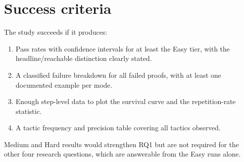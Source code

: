 \section{Success criteria}

The study succeeds if it produces:
\begin{enumerate}
  \item Pass rates with confidence intervals for at least the Easy tier,
        with the headline/reachable distinction clearly stated.
  \item A classified failure breakdown for all failed proofs,
        with at least one documented example per mode.
  \item Enough step-level data to plot the survival curve and
        the repetition-rate statistic.
  \item A tactic frequency and precision table covering all tactics observed.
\end{enumerate}
Medium and Hard results would strengthen RQ1 but are not required for the
other four research questions, which are answerable from the Easy runs alone.
